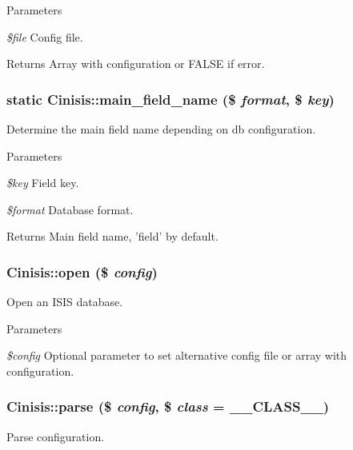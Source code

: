 \begin{DoxyParams}{Parameters}
\item[{\em \$file}]Config file.\end{DoxyParams}
\begin{DoxyReturn}{Returns}
Array with configuration or FALSE if error. 
\end{DoxyReturn}
\hypertarget{classCinisis_ac470ab9dc1f8c02545708f1c7b820d9e}{
\subsubsection[{main\_\-field\_\-name}]{\setlength{\rightskip}{0pt plus 5cm}static Cinisis::main\_\-field\_\-name (\$ {\em format}, \/  \$ {\em key})}}
\label{classCinisis_ac470ab9dc1f8c02545708f1c7b820d9e}
Determine the main field name depending on db configuration.


\begin{DoxyParams}{Parameters}
\item[{\em \$key}]Field key.\item[{\em \$format}]Database format.\end{DoxyParams}
\begin{DoxyReturn}{Returns}
Main field name, 'field' by default. 
\end{DoxyReturn}
\hypertarget{classCinisis_ad5ebe493037aad5a2d8a2f6c51fab09f}{
\subsubsection[{open}]{\setlength{\rightskip}{0pt plus 5cm}Cinisis::open (\$ {\em config})}}
\label{classCinisis_ad5ebe493037aad5a2d8a2f6c51fab09f}
Open an ISIS database.


\begin{DoxyParams}{Parameters}
\item[{\em \$config}]Optional parameter to set alternative config file or array with configuration. \end{DoxyParams}
\hypertarget{classCinisis_ae8d2f767bfb149031b1ac7077c45c7d6}{
\subsubsection[{parse}]{\setlength{\rightskip}{0pt plus 5cm}Cinisis::parse (\$ {\em config}, \/  \$ {\em class} = {\ttfamily \_\-\_\-CLASS\_\-\_\-})}}
\label{classCinisis_ae8d2f767bfb149031b1ac7077c45c7d6}
Parse configuration.


